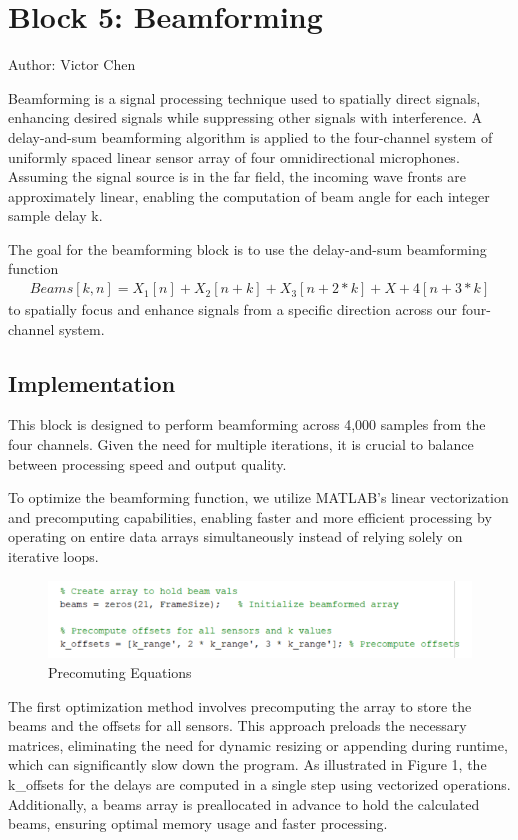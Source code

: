 
\section{Block 5: Beamforming}
Author: Victor Chen

Beamforming is a signal processing technique used to spatially direct signals, enhancing desired signals while suppressing other signals with interference. A delay-and-sum beamforming algorithm is applied to the four-channel system of uniformly spaced linear sensor array of four omnidirectional microphones. Assuming the signal source is in the far field, the incoming wave fronts are approximately linear, enabling the computation of beam angle for each integer sample delay k.

The goal for the beamforming block is to use the delay-and-sum beamforming function 
\begin{align*}
    Beams[k,n] = X_1[n]+X_2[n+k]+X_3[n+2*k]+X+4[n+3*k]
\end{align*}
to spatially focus and enhance signals from a specific direction across our four-channel system.


\subsection{Implementation}

This block is designed to perform beamforming across 4,000 samples from the four channels. Given the need for multiple iterations, it is crucial to balance between processing speed and output quality.

To optimize the beamforming function, we utilize \textsc{MATLAB}'s linear vectorization and precomputing capabilities, enabling faster and more efficient processing by operating on entire data arrays simultaneously instead of relying solely on iterative loops.

\begin{figure}[H]
    \centering
    \includegraphics[width=0.5\linewidth]{figures/beamform_fig1.png}
    \caption{Precomuting Equations}
    \label{fig:precomputing_equations}
\end{figure}

The first optimization method involves precomputing the array to store the beams and the offsets for all sensors. This approach preloads the necessary matrices, eliminating the need for dynamic resizing or appending during runtime, which can significantly slow down the program. As illustrated in Figure 1, the k\_offsets for the delays are computed in a single step using vectorized operations. Additionally, a beams array is preallocated in advance to hold the calculated beams, ensuring optimal memory usage and faster processing.

